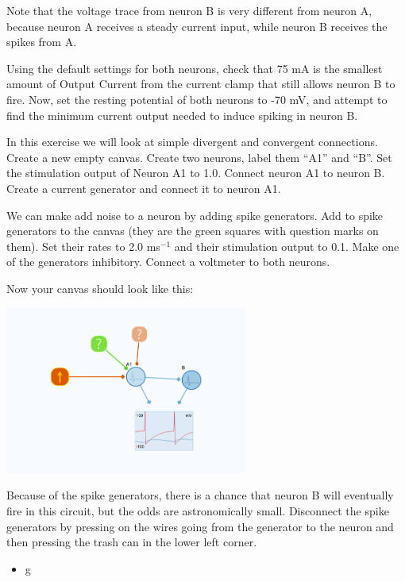 \begin{Exercise}[title=Small Networks]
\begin{ExePart}
Note that the voltage trace from neuron B is very different from neuron A, because neuron A receives a steady current input, while neuron B receives the spikes from A. 

Using the default settings for both neurons, check that 75 mA is the smallest amount of Output Current from the current clamp that still allows neuron B to fire. Now, set the resting potential of both neurons to -70 mV, and attempt to find the minimum current output needed to induce spiking in neuron B.
\end{ExePart}

\begin{ExePart}
In this exercise we will look at simple divergent and convergent connections. Create a new empty canvas. Create two neurons, label them ``A1'' and ``B''. Set the stimulation output of Neuron A1 to 1.0. Connect neuron A1 to neuron B. Create a current generator and connect it to neuron A1. 

We can make add noise to a neuron by adding spike generators. Add to spike generators to the canvas (they are the green squares with question marks on them). Set their rates to 2.0 ms$^{-1}$ and their stimulation output to 0.1. Make one of the generators inhibitory. Connect a voltmeter to both neurons. 

Now your canvas should look like this: 
\begin{center}
\includegraphics[width=8cm]{two_neurons_noise.png}
\end{center}

Because of the spike generators, there is a chance that neuron B will eventually fire in this circuit, but the odds are astronomically small. Disconnect the spike generators by pressing on the wires going from the generator to the neuron and then pressing the trash can in the lower left corner. 
\begin{itemize}
\item g
\end{itemize}
\end{ExePart}



\end{Exercise}